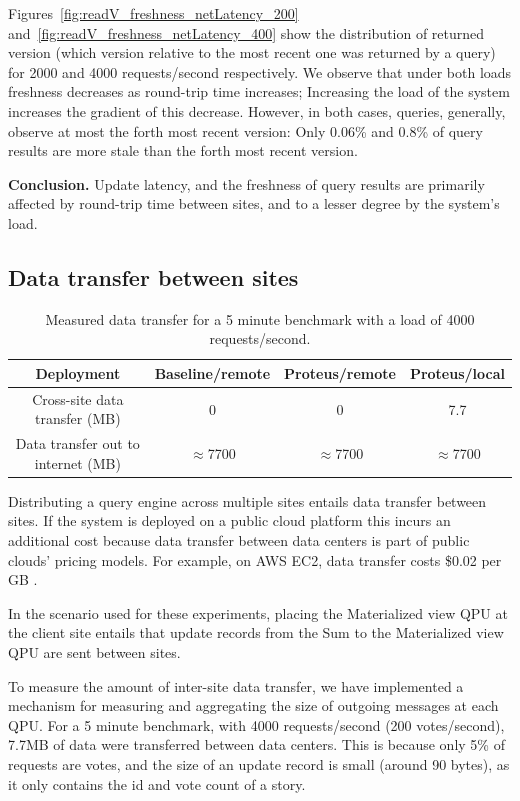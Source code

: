 Figures~\ref{fig:readV_freshness_netLatency_200} and~\ref{fig:readV_freshness_netLatency_400}
show the distribution of returned version (which version relative to the most recent one was returned by a query)
for 2000 and 4000 requests/second respectively.
We observe that under both loads freshness decreases as round-trip time increases;
Increasing the load of the system increases the gradient of this decrease.
However, in both cases, queries, generally, observe at most the forth most recent version:
Only 0.06\% and 0.8\% of query results are more stale than the forth most recent version.

\medskip
\noindent
\textbf{Conclusion.}
Update latency, and the freshness of query results are primarily affected by round-trip time between sites,
and to a lesser degree by the system's load.

\subsection{Data transfer between sites}
\label{sec:eval_data_transfer}

\begin{table}[H]
\centering
\begin{tabular}{|c||c|c|c||}
\hline
Deployment & Baseline/remote & Proteus/remote & Proteus/local \\
\hline
Cross-site data transfer (MB) & 0 & 0 & 7.7 \\
\hline
Data transfer out to internet (MB) & $\approx$7700 & $\approx$7700 & $\approx$7700 \\
\hline
\end{tabular}
\caption{Measured data transfer for a 5 minute benchmark with a load of 4000 requests/second.}
\label{tab:data_transfer}
\end{table}

Distributing a query engine across multiple sites entails data transfer between sites.
If the system is deployed on a public cloud platform this incurs an additional cost
because data transfer between data centers is part of public clouds' pricing models.
For example, on AWS EC2, data transfer costs \$0.02 per GB \cite{aws:pricing}.

In the scenario used for these experiments, placing the Materialized view QPU at the client site entails that
update records from the Sum to the Materialized view QPU are sent between sites.

To measure the amount of inter-site data transfer,
we have implemented a mechanism for measuring and aggregating the size of outgoing messages at each QPU.
For a 5 minute benchmark, with 4000 requests/second (200 votes/second), 7.7MB of data were transferred between data centers.
This is because only 5\% of requests are votes, and the size of an update record is small (around 90 bytes),
as it only contains the id and vote count of a story.

